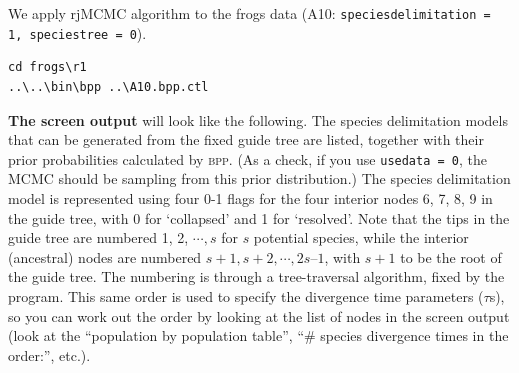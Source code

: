 \documentclass[a4paper]{book}
\numberwithin{equation}{section} \renewcommand{\baselinestretch}{0.55}
\begin{document}
We apply rjMCMC algorithm to the frogs data (A10:
\texttt{speciesdelimitation = 1, speciestree = 0}).
\begin{verbatim}
cd frogs\r1
..\..\bin\bpp ..\A10.bpp.ctl
\end{verbatim}
\textbf{The screen output} will look like the following.  The species
delimitation models that can be generated from the fixed guide tree
are listed, together with their prior probabilities calculated by
\textsc{bpp}.  (As a check, if you use \texttt{usedata = 0}, the MCMC
should be sampling from this prior distribution.)  The species
delimitation model is represented using four 0-1 flags for the four
interior nodes 6, 7, 8, 9 in the guide tree, with 0 for ‘collapsed’
and 1 for ‘resolved’.  Note that the tips in the guide tree are
numbered 1, 2, $\cdots, s$ for $s$ potential species, while the
interior (ancestral) nodes are numbered
$s + 1, s + 2, \cdots, 2s – 1$, with $s + 1$ to be the root of the
guide tree.  The numbering is through a tree-traversal algorithm,
fixed by the program.  This same order is used to specify the
divergence time parameters ($\tau$s), so you can work out the order by
looking at the list of nodes in the screen output (look at the
``population by population table'', ``\# species divergence times in
the order:'', etc.).
\end{document}
